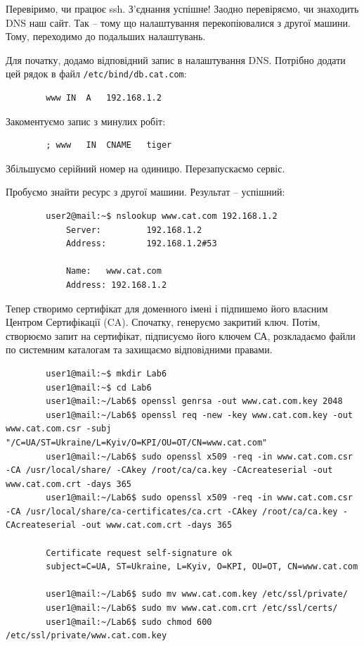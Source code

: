 \documentclass[14pt, a4paper]{extreport}
\begin{document}
	Перевіримо, чи працює ssh. З'єднання успішне! Заодно перевіряємо, чи знаходить DNS наш сайт. Так -- тому що налаштування перекопіювалися з другої машини. Тому, переходимо до подальших налаштувань.
	
	
	Для початку, додамо відповідний запис в налаштування DNS. Потрібно додати цей рядок в файл \texttt{/etc/bind/db.cat.com}: \sideat{[VM 1]}
	
	\begin{verbatim}
		www	IN	A	192.168.1.2
	\end{verbatim}
	
	Закоментуємо запис з минулих робіт: \sideat{[VM 1]}
	
	\begin{verbatim}
		; www 	IN	CNAME	tiger
	\end{verbatim}
	
	Збільшуємо серійний номер на одиницю. Перезапускаємо сервіс. \sideat{[VM 1]}
	
	
	Пробуємо знайти ресурс з другої машини. Результат -- успішний: \sideat{[VM 2]}
	
	\begin{verbatim}
		user2@mail:~$ nslookup www.cat.com 192.168.1.2
			Server:         192.168.1.2
			Address:        192.168.1.2#53
		
			Name:   www.cat.com
			Address: 192.168.1.2
	\end{verbatim}
	
	Тепер створимо сертифікат для доменного імені і підпишемо його власним Центром Сертифікації (CA). Спочатку, генеруємо закритий ключ. Потім, створюємо запит на сертифікат, підписуємо його ключем СА, розкладаємо файли по системним каталогам та захищаємо відповідними правами. \sideat{[VM 1]}
	
	\begin{verbatim}
		user1@mail:~$ mkdir Lab6
		user1@mail:~$ cd Lab6
		user1@mail:~/Lab6$ openssl genrsa -out www.cat.com.key 2048
		user1@mail:~/Lab6$ openssl req -new -key www.cat.com.key -out www.cat.com.csr -subj "/C=UA/ST=Ukraine/L=Kyiv/O=KPI/OU=OT/CN=www.cat.com"
		user1@mail:~/Lab6$ sudo openssl x509 -req -in www.cat.com.csr -CA /usr/local/share/ -CAkey /root/ca/ca.key -CAcreateserial -out www.cat.com.crt -days 365  
		user1@mail:~/Lab6$ sudo openssl x509 -req -in www.cat.com.csr -CA /usr/local/share/ca-certificates/ca.crt -CAkey /root/ca/ca.key -CAcreateserial -out www.cat.com.crt -days 365
		
		Certificate request self-signature ok
		subject=C=UA, ST=Ukraine, L=Kyiv, O=KPI, OU=OT, CN=www.cat.com
		
		user1@mail:~/Lab6$ sudo mv www.cat.com.key /etc/ssl/private/
		user1@mail:~/Lab6$ sudo mv www.cat.com.crt /etc/ssl/certs/
		user1@mail:~/Lab6$ sudo chmod 600 /etc/ssl/private/www.cat.com.key
	\end{verbatim}
	
\end{document}
